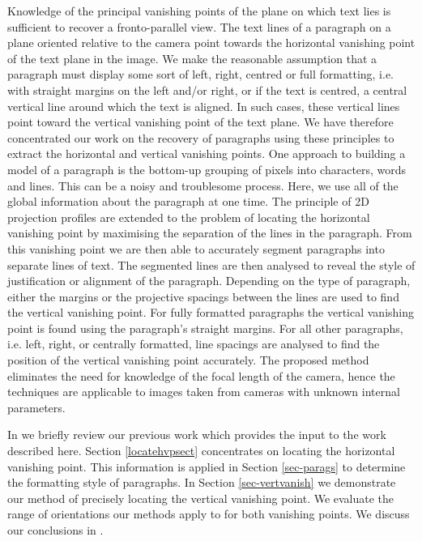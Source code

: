 \documentclass{elsart}   %
\begin{document}
Knowledge of the principal vanishing points of the plane on which text lies is
sufficient to recover a fronto-parallel view. The text lines of a paragraph
on a plane oriented relative to the camera  point towards
the horizontal vanishing point of the text plane in the image. We make the
reasonable assumption that a paragraph must display some sort of
 left,  right, centred or full  formatting, i.e. with straight margins on the
left and/or right, or if the text is centred, a central vertical line around which
the text is aligned.  In such cases, these vertical lines point toward the
vertical vanishing point of the text plane.  We have therefore concentrated our
work on the recovery of paragraphs using these principles to extract the
horizontal and vertical vanishing points. 
One approach to building a model of a paragraph is the bottom-up grouping of
pixels into characters, words and lines. This can be a noisy and troublesome
process. Here, we use all of the global information about the paragraph at one
time.  The principle of 2D projection profiles are extended to the problem of
locating the horizontal vanishing point by maximising the separation of the
lines in the paragraph.  From this vanishing point we are then able to
accurately segment paragraphs into separate lines of text.  The segmented lines
are then analysed to reveal the style of justification or alignment of the
paragraph.  Depending on the type of paragraph, either the margins or the projective
spacings between the lines are used to find the vertical vanishing point. For
fully formatted paragraphs the vertical vanishing point is found
using the paragraph's straight margins. For all other paragraphs,  i.e. left,
right, or centrally formatted,  line spacings are analysed to find
the position of the vertical vanishing point accurately. 
The proposed method eliminates the need for knowledge of 
the focal length of the camera, hence the techniques are applicable to images
taken from cameras with unknown internal parameters.

 
 In 
we briefly review our previous work which provides the input to the work
described here.  Section \ref{locatehvpsect} concentrates on locating the
horizontal vanishing point. This information is applied in Section
\ref{sec-parags} to determine the formatting style of paragraphs.
In Section \ref{sec-vertvanish}  we demonstrate our method of precisely
locating the vertical vanishing point. We evaluate 
the range of orientations our methods apply to for both vanishing points. 
We discuss our conclusions in .




\end{document}
